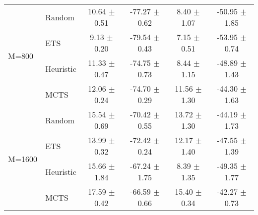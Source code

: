 \begin{tabular}{llcccc}
\midrule
\multirow{4}{*}{M=800}  & Random          & 10.64 $\pm$ 0.51       & -77.27 $\pm$ 0.62       & 8.40 $\pm$ 1.07          & -50.95 $\pm$ 1.85        \\
                        & ETS             & 9.13 $\pm$ 0.20        & -79.54 $\pm$ 0.43       & 7.15 $\pm$ 0.51          & -53.95 $\pm$ 0.74        \\
                        & Heuristic         & 11.33 $\pm$ 0.47       & -74.75 $\pm$ 0.73       & 8.44 $\pm$ 1.15          & -48.89 $\pm$ 1.43        \\
                        & MCTS            & 12.06 $\pm$ 0.24       & -74.70 $\pm$ 0.29       & 11.56 $\pm$ 1.30         & -44.30 $\pm$ 1.63        \\
\midrule
\multirow{4}{*}{M=1600} & Random          & 15.54 $\pm$ 0.69       & -70.42 $\pm$ 0.55       & 13.72 $\pm$ 1.30         & -44.19 $\pm$ 1.73        \\
                        & ETS             & 13.99 $\pm$ 0.32       & -72.42 $\pm$ 0.24       & 12.17 $\pm$ 1.40         & -47.55 $\pm$ 1.39        \\
                        & Heuristic         & 15.66 $\pm$ 1.84       & -67.24 $\pm$ 1.75       & 8.39 $\pm$ 1.35          & -49.35 $\pm$ 1.77        \\
                        & MCTS            & 17.59 $\pm$ 0.42       & -66.59 $\pm$ 0.66       & 15.40 $\pm$ 0.34         & -42.27 $\pm$ 0.73       \\
\bottomrule
\end{tabular}
